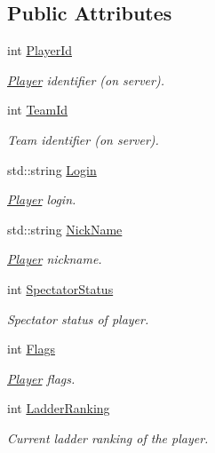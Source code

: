 \subsection*{Public Attributes}
\begin{DoxyCompactItemize}
\item 
int \hyperlink{structPlayer_a6a71d7d9837a0a12e52ca47930965e0f}{Player\-Id}
\begin{DoxyCompactList}\small\item\em \hyperlink{structPlayer}{Player} identifier (on server). \end{DoxyCompactList}\item 
int \hyperlink{structPlayer_a350919664ba73d6d6cd6d03bd2a5cacd}{Team\-Id}
\begin{DoxyCompactList}\small\item\em Team identifier (on server). \end{DoxyCompactList}\item 
std\-::string \hyperlink{structPlayer_a38398818d43e186aa982a788744792d7}{Login}
\begin{DoxyCompactList}\small\item\em \hyperlink{structPlayer}{Player} login. \end{DoxyCompactList}\item 
std\-::string \hyperlink{structPlayer_a553cc1b0aa79108b511ba408210582cf}{Nick\-Name}
\begin{DoxyCompactList}\small\item\em \hyperlink{structPlayer}{Player} nickname. \end{DoxyCompactList}\item 
int \hyperlink{structPlayer_a2037601661fb699454a88b5649485b30}{Spectator\-Status}
\begin{DoxyCompactList}\small\item\em Spectator status of player. \end{DoxyCompactList}\item 
int \hyperlink{structPlayer_aa151b994eedc8ba67b3fd48905db5ac0}{Flags}
\begin{DoxyCompactList}\small\item\em \hyperlink{structPlayer}{Player} flags. \end{DoxyCompactList}\item 
int \hyperlink{structPlayer_a25fe69852f0e38f541ad615cd59877ef}{Ladder\-Ranking}
\begin{DoxyCompactList}\small\item\em Current ladder ranking of the player. \end{DoxyCompactList}\end{DoxyCompactItemize}


